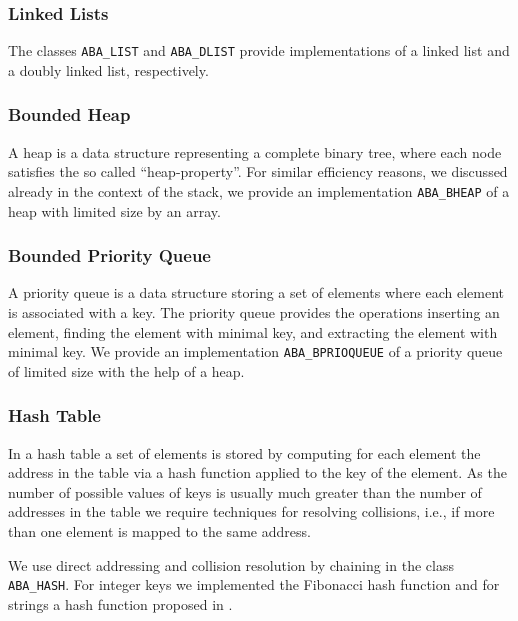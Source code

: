 \subsubsection{Linked Lists}
\noindent
The classes {\tt ABA\_LIST} and 
{\tt ABA\_DLIST} provide implementations of a linked
list and a doubly linked list, respectively.

\subsubsection{Bounded Heap}
\noindent
A heap is a data structure representing a complete binary tree, where
each node satisfies the so called ``heap-property''.
For similar efficiency reasons, we discussed already in the context of the
stack, we provide an implementation 
{\tt ABA\_BHEAP} of a heap with limited size by
an array.

\subsubsection{Bounded Priority Queue}
\noindent
A priority queue is a data structure storing a set of elements where
each element is associated with a key. The priority queue provides
the operations inserting an element, finding the element with minimal key,
and extracting the element with minimal key. We provide an implementation
{\tt ABA\_BPRIOQUEUE} of
a priority queue of limited size with the help of a heap.

\subsubsection{Hash Table}
\noindent
In a hash table a set of elements is stored by computing for each element
the address in the table via a hash function applied to the key of the
element. As the number of possible values of keys is usually much greater
than the number of addresses in the table we require techniques
for resolving collisions, i.e., if more than one element is mapped to the
same address.

We use direct addressing and collision resolution by chaining in
the class {\tt ABA\_HASH}.
For integer keys we implemented the Fibonacci hash function and
for strings a hash function proposed in \cite{Knu93a}.

